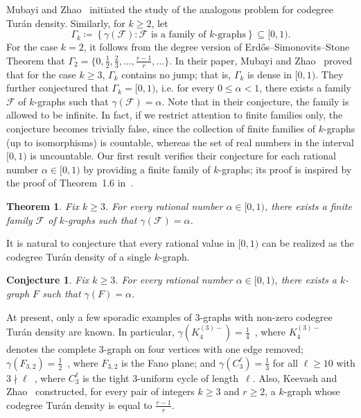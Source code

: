 \documentclass[11pt,a4paper]{article}
\newtheorem{theorem}[definition]{Theorem}
\newtheorem{conjecture}[definition]{Conjecture}
\theoremstyle{remark}
\newcommand{\C}[1]{\mathcal{#1}}
\begin{document}
Mubayi and Zhao~\cite{MZ07} initiated the study of the analogous problem for codegree Tur\'an density. Similarly, for $k\ge 2$, let
\[
\Gamma_k \coloneqq \left\{\gamma(\C F) \colon \text{$\C F$ is a family of $k$-graphs}\right\}\subseteq [0,1).
\]
For the case $k=2$, it follows from the degree version of Erd\H{o}s--Simonovits--Stone Theorem that $\Gamma_2 = \{0,\frac{1}{2},\frac{2}{3},\dots,\frac{r-1}{r},\dots \}$. In their paper, Mubayi and Zhao~\cite[Theorem~1.6]{MZ07} proved that for the case $k \ge 3$, 
$\Gamma_k$ contains no jump; that is, $\Gamma_k$ is dense in $[0,1)$. They further conjectured that $\Gamma_k=[0,1)$, i.e. for every $0\le \alpha<1$, there exists a family $\C F$ of $k$-graphs such that $\gamma(\C F)=\alpha$. 
Note that in their conjecture, the family is allowed to be infinite. 
In fact, if we restrict attention to finite families only, the conjecture 
becomes trivially false, since the collection of finite families of $k$-graphs  (up to isomorphisms)
is countable, whereas the set of real numbers in the interval $[0,1)$ is uncountable.
Our first result verifies their conjecture for each rational number $\alpha\in [0,1)$ by providing a finite family of $k$-graphs; its proof is inspired by the proof of Theorem~1.6 in~\cite{MZ07}.

\begin{theorem}\label{thm:rational}
    Fix $k\ge 3$. For every rational number $\alpha\in [0,1)$, there exists a finite family $\C F$ of $k$-graphs such that $\gamma(\C F)=\alpha$.
\end{theorem}
It is natural to conjecture that every rational value in $[0,1)$ can be realized 
as the codegree Tur\'an density of a single $k$-graph.

\begin{conjecture}
Fix $k \ge 3$. For every rational number $\alpha \in [0,1)$, there exists a $k$-graph $F$ such that $\gamma(F)=\alpha$.
\end{conjecture}

At present, only a few sporadic examples of $3$-graphs with non-zero codegree Tur\'an density are known. 
In particular,
$\gamma(K_4^{(3)-})=\frac{1}{4}$~\cite{FPVV23}, where $K_4^{(3)-}$ denotes the complete $3$-graph on four vertices 
with one edge removed;
$\gamma(F_{3,2})=\frac{1}{2}$~\cite{Mubayi05}, where $F_{3,2}$ is the Fano plane; 
and $\gamma(C_3^{\ell})=\frac{1}{3}$ for all $\ell \ge 10$ with $3 \nmid \ell$~\cite{Ma2025,PSNS26}, 
where $C_3^{\ell}$ is the tight $3$-uniform cycle of length~$\ell$. Also, Keevash and Zhao~\cite{KZ07} constructed, for every pair of integers $k\ge 3$ and $r \ge 2$, 
a $k$-graph whose codegree Tur\'an density is equal to $\frac{r-1}{r}$.
\end{document}
